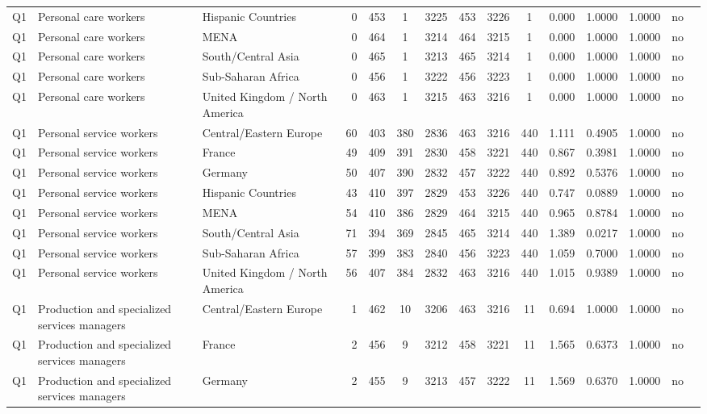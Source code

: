 \begin{longtable}{lllrcccccccccll}
Q1 & Personal care workers & Hispanic Countries & 0 & 453 & 1 & 3225 & 453 & 3226 & 1 & 0.000 & 1.0000 & 1.0000 & no \\
Q1 & Personal care workers & MENA & 0 & 464 & 1 & 3214 & 464 & 3215 & 1 & 0.000 & 1.0000 & 1.0000 & no \\
Q1 & Personal care workers & South/Central Asia & 0 & 465 & 1 & 3213 & 465 & 3214 & 1 & 0.000 & 1.0000 & 1.0000 & no \\
Q1 & Personal care workers & Sub-Saharan Africa & 0 & 456 & 1 & 3222 & 456 & 3223 & 1 & 0.000 & 1.0000 & 1.0000 & no \\
Q1 & Personal care workers & United Kingdom / North America & 0 & 463 & 1 & 3215 & 463 & 3216 & 1 & 0.000 & 1.0000 & 1.0000 & no \\
Q1 & Personal service workers & Central/Eastern Europe & 60 & 403 & 380 & 2836 & 463 & 3216 & 440 & 1.111 & 0.4905 & 1.0000 & no \\
Q1 & Personal service workers & France & 49 & 409 & 391 & 2830 & 458 & 3221 & 440 & 0.867 & 0.3981 & 1.0000 & no \\
Q1 & Personal service workers & Germany & 50 & 407 & 390 & 2832 & 457 & 3222 & 440 & 0.892 & 0.5376 & 1.0000 & no \\
Q1 & Personal service workers & Hispanic Countries & 43 & 410 & 397 & 2829 & 453 & 3226 & 440 & 0.747 & 0.0889 & 1.0000 & no \\
Q1 & Personal service workers & MENA & 54 & 410 & 386 & 2829 & 464 & 3215 & 440 & 0.965 & 0.8784 & 1.0000 & no \\
Q1 & Personal service workers & South/Central Asia & 71 & 394 & 369 & 2845 & 465 & 3214 & 440 & 1.389 & 0.0217 & 1.0000 & no \\
Q1 & Personal service workers & Sub-Saharan Africa & 57 & 399 & 383 & 2840 & 456 & 3223 & 440 & 1.059 & 0.7000 & 1.0000 & no \\
Q1 & Personal service workers & United Kingdom / North America & 56 & 407 & 384 & 2832 & 463 & 3216 & 440 & 1.015 & 0.9389 & 1.0000 & no \\
Q1 & Production and specialized services managers & Central/Eastern Europe & 1 & 462 & 10 & 3206 & 463 & 3216 & 11 & 0.694 & 1.0000 & 1.0000 & no \\
Q1 & Production and specialized services managers & France & 2 & 456 & 9 & 3212 & 458 & 3221 & 11 & 1.565 & 0.6373 & 1.0000 & no \\
Q1 & Production and specialized services managers & Germany & 2 & 455 & 9 & 3213 & 457 & 3222 & 11 & 1.569 & 0.6370 & 1.0000 & no \\

\end{longtable}
